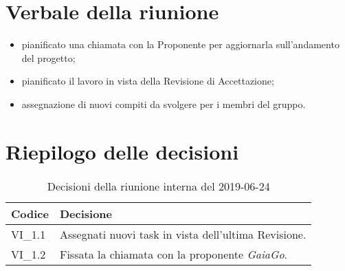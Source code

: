 \section{Verbale della riunione}
\begin{itemize}
	\item pianificato una chiamata con la Proponente per aggiornarla sull'andamento del progetto;
	\item pianificato il lavoro in vista della Revisione di Accettazione;
	\item assegnazione di nuovi compiti da svolgere per i membri del gruppo.
\end{itemize} 

\section{Riepilogo delle decisioni}

	
	\begin{longtable}{ >{\centering}p{} >{}p{}}
		\caption{Decisioni della riunione interna del 2019-06-24}\\	
		\rowcolorhead
		\textbf{\color{white}Codice} 
		& \centering\textbf{\color{white}Decisione} 
		\tabularnewline 
		\endfirsthead 
		VI\_1.1 & Assegnati nuovi task in vista dell'ultima Revisione.
		
		\tabularnewline 
		VI\_1.2 & Fissata la chiamata con la proponente \textit{GaiaGo}.
		
	\end{longtable}
	




